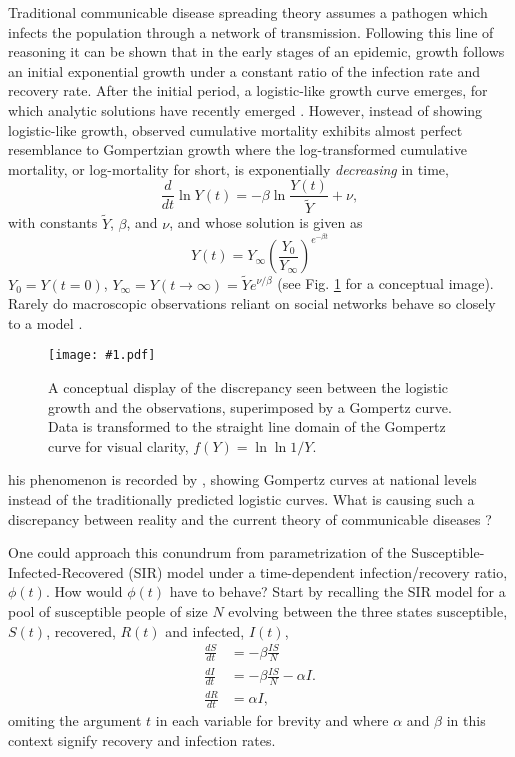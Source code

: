 \documentclass[review]{elsarticle}
\newcommand{\insertSmallPdfFig}[3]{
  \begin{figure}[h]
  \centering
  \texttt{[image: \#1.pdf]}
  \caption{#2}
  \label{fig:#1}
  \end{figure}
}
\begin{document}
Traditional communicable disease spreading theory assumes a pathogen which infects the population through a network of transmission. Following this line of reasoning it can be shown that in the early stages of an epidemic, growth follows an initial exponential growth under a constant ratio of the infection rate and recovery rate. After the initial period, a logistic-like growth curve emerges, for which analytic solutions have recently emerged \citep{harko2014exact,kroger2020analytical,schlickeiser2021analytical,heng2020approximately,carletti2020covid}. However, instead of showing logistic-like growth, observed cumulative mortality exhibits almost perfect resemblance to Gompertzian growth \citep{Gompertz1825} where the log-transformed cumulative mortality, or log-mortality for short, is exponentially \emph{decreasing} in time,
\begin{equation}
\label{eq:GompertzODE}
\frac{d}{dt}\ln{Y(t)} = -\beta\ln{\frac{Y(t)}{\tilde{Y}}} + \nu,
\end{equation} 
with constants $\tilde{Y}$, $\beta$, and $\nu$, and whose solution is given as
\begin{equation}
\label{eq:gomp_solution}
Y(t) = Y_\infty \left(\frac{Y_0}{Y_\infty}\right)^{e^{-\beta t}}
\end{equation}
$Y_{0}=Y(t = 0)$, $Y_{\infty}=Y(t\rightarrow \infty)=\tilde{Y}e^{\nu/\beta}$ (see Fig. \ref{fig:Gompertz_concept} for a conceptual image). Rarely do macroscopic observations reliant on social networks behave so closely to a model \citep{broido2019scale}.

\insertSmallPdfFig{Gompertz_concept}{A conceptual display of the discrepancy seen between the logistic growth and the observations, superimposed by a Gompertz curve. Data is transformed to the straight line domain of the Gompertz curve for visual clarity, $f(Y)=\ln{\ln{1/Y}}$.}

This phenomenon is recorded by \citep{Ohnishi2020,Rypdal2020,Catala2020,rodrigues2020monte,Levitt2020}, showing Gompertz curves at national levels instead of the traditionally predicted logistic curves. What is causing such a discrepancy between reality and the current theory of communicable diseases \citep{castro2020turning}?

One could approach this conundrum from parametrization of the Susceptible-Infected-Recovered (SIR) model under a time-dependent infection/recovery ratio, $\phi(t)$. How would $\phi(t)$ have to behave? Start by recalling the SIR model for a pool of susceptible people of size $N$ evolving between the three states susceptible, $S(t)$, recovered, $R(t)$ and infected, $I(t)$,
\begin{align}
\label{eq:SIR}
\frac{dS}{dt}& = -\beta \frac{IS}{N}\\
\frac{dI}{dt}& = -\beta \frac{IS}{N} - \alpha I.\\
\frac{dR}{dt}& = \alpha I,
\end{align}
omiting the argument $t$ in each variable for brevity and where $\alpha$ and $\beta$ in this context signify recovery and infection rates.
\end{document}
